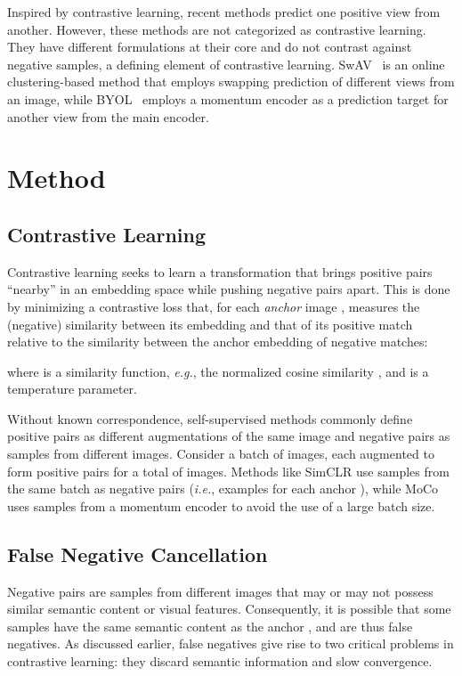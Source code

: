 \documentclass[10pt,twocolumn,letterpaper]{article}
\begin{document}
Inspired by contrastive learning, recent methods predict one positive view from another. However, these methods are not categorized as contrastive learning. They have different formulations at their core and do not contrast against negative samples, a defining element of contrastive learning. SwAV~\cite{caron2020unsupervised} is an online clustering-based method that employs swapping prediction of different views from an image, while BYOL~\cite{grill2020bootstrap} employs a momentum encoder as a prediction target for another view from the main encoder.





 \section{Method}
\label{sec:method}

\subsection{Contrastive Learning}
Contrastive learning seeks to learn a transformation that brings positive pairs ``nearby'' in an embedding space while pushing negative pairs apart. This is done by minimizing a contrastive loss that, for each \emph{anchor} image , measures the (negative) similarity between its embedding  and that of its positive match  relative to the similarity between the anchor embedding of  negative matches:

where  is a similarity function, \emph{e.g.}, the  normalized cosine similarity , and  is a temperature parameter.

Without known correspondence, self-supervised methods commonly define positive pairs as different augmentations of the same image and negative pairs as samples from different images. Consider a batch of  images, each augmented to form  positive pairs for a total of  images. Methods like SimCLR use samples from the same batch as negative pairs (\emph{i.e.},  examples for each anchor ), while MoCo uses samples from a momentum encoder to avoid the use of a large batch size.




\subsection{False Negative Cancellation}
Negative pairs are samples from different images that may or may not possess similar semantic content or visual features. Consequently, it is possible that some samples  have the same semantic content as the anchor , and are thus false negatives. As discussed earlier, false negatives give rise to two critical problems in contrastive learning: they discard semantic information and slow convergence.
\end{document}
